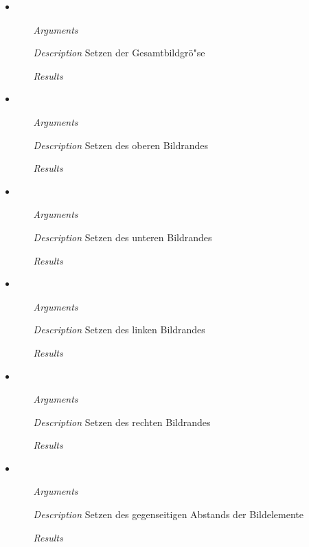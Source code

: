 \begin{description}
\begin{itemize}
\item {}
\begin{enumerate}
\item[\textit{Arguments}] 
\item[\textit{Description}] Setzen der Gesamtbildgr\"o"se
\item[\textit{Results}] 
\end{enumerate}

\item {}
\begin{enumerate}
\item[\textit{Arguments}] 
\item[\textit{Description}] Setzen des oberen Bildrandes
\item[\textit{Results}] 
\end{enumerate}

\item {}
\begin{enumerate}
\item[\textit{Arguments}] 
\item[\textit{Description}] Setzen des unteren Bildrandes
\item[\textit{Results}] 
\end{enumerate}

\item {}
\begin{enumerate}
\item[\textit{Arguments}] 
\item[\textit{Description}] Setzen des linken Bildrandes
\item[\textit{Results}] 
\end{enumerate}

\item {}
\begin{enumerate}
\item[\textit{Arguments}] 
\item[\textit{Description}] Setzen des rechten Bildrandes
\item[\textit{Results}] 
\end{enumerate}

\item {}
\begin{enumerate}
\item[\textit{Arguments}] 
\item[\textit{Description}] Setzen des gegenseitigen Abstands der
  Bildelemente
\item[\textit{Results}] 
\end{enumerate}


\end{itemize}
\end{description}
